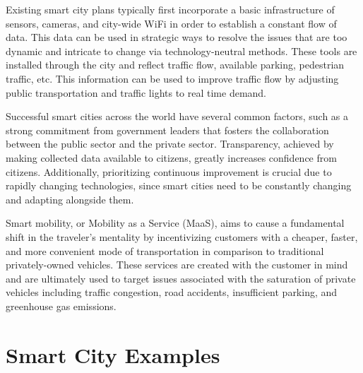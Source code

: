 \documentclass[12pt]{article}                         %
\begin{document}
Existing smart city plans typically first incorporate a basic infrastructure of sensors, cameras, and city-wide WiFi in order to establish a constant flow of data. This data can be used in strategic ways to resolve the issues that are too dynamic and intricate to change via technology-neutral methods. These tools are installed through the city and reflect traffic flow, available parking, pedestrian traffic, etc. This information can be used to improve traffic flow by adjusting public transportation and traffic lights to real time demand. 

Successful smart cities across the world have several common factors, such as a strong commitment from government leaders that fosters the collaboration between the public sector and the private sector. Transparency, achieved by making collected data available to citizens, greatly increases confidence from citizens. Additionally, prioritizing continuous improvement is crucial due to rapidly changing technologies, since smart cities need to be constantly changing and adapting alongside them. 

Smart mobility, or Mobility as a Service (MaaS), aims to cause a fundamental shift in the traveler’s mentality by incentivizing customers with a cheaper, faster, and more convenient mode of transportation in comparison to traditional privately-owned vehicles. These services are created with the customer in mind and are ultimately used to target issues associated with the saturation of private vehicles including traffic congestion, road accidents, insufficient parking, and greenhouse gas emissions.

\section{Smart City Examples}
\end{document}
